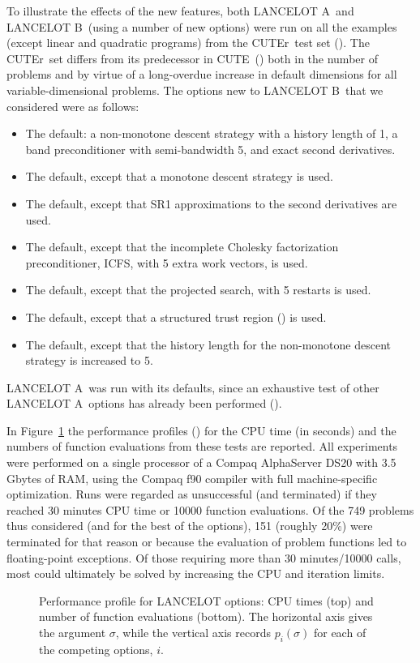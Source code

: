 \documentclass[twoside]{article}
\newcommand{\lana}{{\sf LANCELOT A}}
\newcommand{\lanb}{{\sf LANCELOT B}}
\newcommand{\cute}{{\sf CUTE}}
\newcommand{\cuter}{{\sf CUTEr}}
\begin{document}
To illustrate the effects of the new features, 
both \lana\ and  \lanb\ (using a number of new options)
were run on all the examples (except linear and quadratic programs) from
the \cuter\ test set (). The \cuter\ 
set differs from its predecessor
in \cute\ ()
both in the number of problems and by virtue of a long-overdue
increase in default dimensions for all variable-dimensional problems.  
The options new to \lanb\ that we considered were as follows:
\begin{itemize}
\item The default: a non-monotone descent strategy with a
history length of 1, a band preconditioner with semi-bandwidth 5, 
and exact second derivatives.
\item The default, except that a monotone descent strategy is used.
\item The default, except that SR1 approximations to the second derivatives
are used.
\item The default, except that the  incomplete Cholesky 
   factorization preconditioner, ICFS, with 5 extra work vectors, is used.
\item The default, except that the \citebb{MoreTora91} projected search,
with 5 restarts is used.
\item The default, except that a structured trust region
   () is used.
\item The default, except that the history length for the 
non-monotone descent strategy is increased to 5.
\end{itemize}
\lana\ was run with its defaults, since an exhaustive test
of other \lana\ options has already been performed 
().

In Figure~\ref{prof.ps}
the performance profiles () for the CPU time
(in seconds) and the numbers of function evaluations  
from these tests are reported. All experiments were performed 
on a single processor of a Compaq AlphaServer DS20 with 3.5 Gbytes of RAM,
using the Compaq f90 compiler with full machine-specific optimization.
Runs were regarded as unsuccessful (and terminated) if they reached 
30 minutes CPU time or 10000 function evaluations.
Of the 749 problems thus considered (and for the best of the 
options), 151 (roughly 20\%) 
were terminated for that reason or because
the evaluation of problem functions led to floating-point exceptions. Of
those requiring more than 30 minutes/10000 calls, most could ultimately 
be solved by increasing the CPU and iteration limits.
\begin{figure}[htbp]
\centerline{
}\centerline{
            }
\caption{Performance profile for LANCELOT options: CPU times (top)
and number of function evaluations (bottom). The horizontal axis
gives the argument $\sigma$, while the vertical axis records $p_i(\sigma)$ 
for each of the competing options, $i$.}
\label{prof.ps}
\end{figure}
\end{document}
